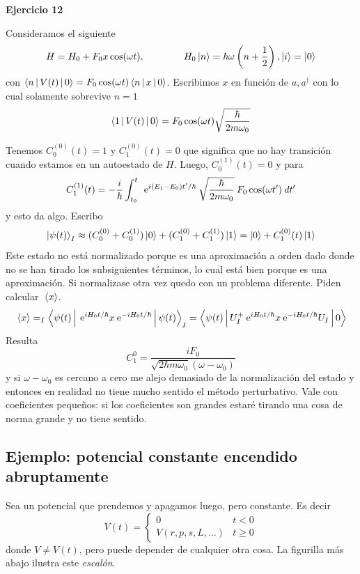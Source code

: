 \documentclass[10pt,oneside]{CBFT_book}
\begin{document}
\begin{ejemplo}{\bf Ejercicio 12}

Consideramos el siguiente
\[
	H = H_0 + F_0 x \cos (\omega t), \qquad \qquad 
	H_0 \Ket{n} = \hbar \omega \left( n + \frac 1 2 \right), \Ket{i} = \Ket{0}
\]
con $\Braket{n|V(t)|0} = F_0 \cos(\omega t) \Braket{n|x|0}$. Escribimos $x$ en función de $a,a^\dagger$
con lo cual solamente sobrevive $n=1$
\[
	\Braket{1|V(t)|0} = F_0  \cos(\omega t) \sqrt{ \frac{\hbar}{2 m \omega_0 } }
\]

Tenemos $C_0^{(0)}(t)=1$ y $C_1^{(0)}(t)=0$ que significa que no hay transición cuando estamos en un
autoestado de $H$.
Luego, $C_0^{(1)}(t)=0$ y para 
\[
	C_1^{(1)}(t) = - \frac{i}{\hbar} \int_{t_0}^t \: \:\mathrm{e}^{i (E_1 - E_0) t' / \hbar } \:
	\sqrt{ \frac{\hbar}{2 m \omega_0 } } \: F_0 \cos(\omega t') \: dt'
\]
y esto da algo.
Escribo
\[
	\Ket{\psi(t)}_I \approx ( C_0^{(0)} + C_0^{(1)}  ) \Ket{0} + ( C_1^{(0)} + C_1^{(1)} ) \Ket{1}
	= \Ket{0} + C_1^{(0)}(t) \Ket{1}
\]
Este estado no está normalizado porque es una aproximación a orden dado donde no se han tirado los
subsiguientes términos, lo cual está bien porque es una aproximación. Si normalizase otra vez quedo
con un problema diferente. Piden calcular $\:\left\langle x \right\rangle$.
\[
	\:\left\langle x \right\rangle = _I\Braket{\psi(t)| \:\mathrm{e}^{i H_0 t/\hbar} x \:\mathrm{e}^{-i H_0 t/\hbar} |\psi(t)}_I
	= \Braket{\psi(t)| U_I^+ \:\mathrm{e}^{i H_0 t/\hbar} x \:\mathrm{e}^{-i H_0 t/\hbar} U_I |0}
\]
Resulta
\[
	C_1^{0} = \frac{i F_0 }{\sqrt{ 2 \hbar m \omega_0 } (\omega - \omega_0)}
\]
y si $\omega - \omega_0$ es cercano a cero me alejo demasiado de la normalización del estado y entonces
en realidad no tiene mucho sentido el método perturbativo.
Vale con coeficientes pequeños: si los coeficientes son grandes estaré tirando una cosa de norma grande
y no tiene sentido.

\end{ejemplo}


\subsection{Ejemplo: potencial constante encendido abruptamente}

Sea un potencial que prendemos y apagamos luego, pero constante. Es decir
\[
	V(t) = \begin{cases}
	0 	& t < 0  \\
	V(r,p,s,L,...) & t \geq 0
	\end{cases}
\]
donde $V \neq V(t)$, pero puede depender de cualquier otra cosa. La figurilla más abajo
ilustra este {\it escalón}.
\end{document}
